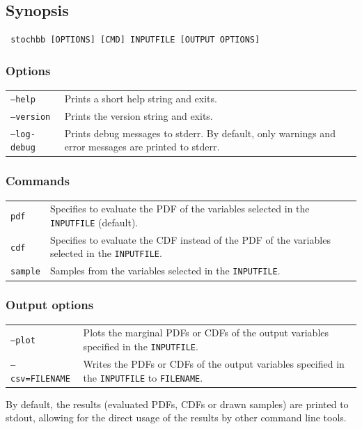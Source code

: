 \documentclass[a4paper, 10pt]{paper}
\newcommand{\code}[1]{\texttt{#1}}
\begin{document}
\subsection{Synopsis}
\begin{lstlisting}
 stochbb [OPTIONS] [CMD] INPUTFILE [OUTPUT OPTIONS]
\end{lstlisting}

\subsubsection{Options}
\begin{tabular}{p{}p{}}
 \code{--help} & Prints a short help string and exits. \\
 \code{--version} & Prints the version string and exits. \\
 \code{--log-debug} &Prints debug messages to stderr. By default, only warnings and error messages
  are printed to stderr. 
\end{tabular}

\subsubsection{Commands}
\begin{tabular}{p{}p{}}
 \code{pdf} & Specifies to evaluate the PDF of the variables selected in the \code{INPUTFILE} (default). \\
 \code{cdf} & Specifies to evaluate the CDF instead of the PDF of the variables selected in the
  \code{INPUTFILE}. \\
 \code{sample} & Samples from the variables selected in the \code{INPUTFILE}.
\end{tabular}

\subsubsection{Output options}
\begin{tabular}{p{}p{}}
 \code{--plot} & Plots the marginal PDFs or CDFs of the output variables specified in the \code{INPUTFILE}. \\
 \code{--csv=FILENAME} & Writes the PDFs or CDFs of the output variables specified in the \code{INPUTFILE}
  to \code{FILENAME}.
\end{tabular}

By default, the results (evaluated PDFs, CDFs or drawn samples) are printed to stdout, allowing for the direct usage 
of the results by other command line tools.
\end{document}
